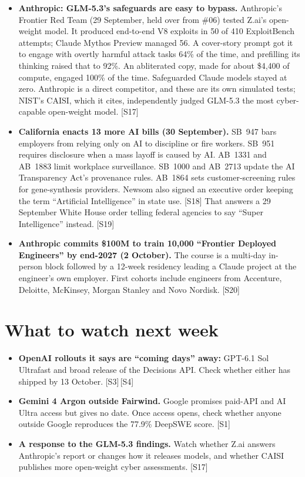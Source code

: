 \documentclass[11pt,a4paper]{article}
\newcommand{\srcref}[1]{\textcolor{brandaccent}{[S#1]}}
\begin{document}
\begin{itemize}
  \item \textbf{Anthropic: GLM-5.3's safeguards are easy to bypass.} Anthropic's Frontier
  Red Team (29 September, held over from \#06) tested Z.ai's open-weight model. It produced
  end-to-end V8 exploits in 50 of 410 ExploitBench attempts; Claude Mythos Preview managed 56.
  A cover-story prompt got it to engage with overtly harmful attack tasks 64\% of the time,
  and prefilling its thinking raised that to 92\%. An abliterated copy, made for about \$4,400
  of compute, engaged 100\% of the time. Safeguarded Claude models stayed at zero. Anthropic
  is a direct competitor, and these are its own simulated tests; NIST's CAISI, which it cites,
  independently judged GLM-5.3 the most cyber-capable open-weight model. \srcref{17}
  \item \textbf{California enacts 13 more AI bills (30 September).} SB~947 bars employers
  from relying only on AI to discipline or fire workers. SB~951 requires disclosure when a mass
  layoff is caused by AI. AB~1331 and AB~1883 limit workplace surveillance. SB~1000 and
  AB~2713 update the AI Transparency Act's provenance rules. AB~1864 sets customer-screening
  rules for gene-synthesis providers. Newsom also signed an executive order keeping the term
  ``Artificial Intelligence'' in state use. \srcref{18} That answers a 29 September White House
  order telling federal agencies to say ``Super Intelligence'' instead. \srcref{19}
  \item \textbf{Anthropic commits \$100M to train 10,000 ``Frontier Deployed Engineers'' by
  end-2027 (2 October).} The course is a multi-day in-person block followed by a 12-week residency
  leading a Claude project at the engineer's own employer. First cohorts include engineers
  from Accenture, Deloitte, McKinsey, Morgan Stanley and Novo Nordisk. \srcref{20}
\end{itemize}

\section{What to watch next week}

\begin{itemize}
  \item \textbf{OpenAI rollouts it says are ``coming days'' away:} GPT-6.1 Sol Ultrafast and
  broad release of the Decisions API. Check whether either has shipped by 13 October. \srcref{3}\,\srcref{4}
  \item \textbf{Gemini 4 Argon outside Fairwind.} Google promises paid-API and AI Ultra access but
  gives no date. Once access opens, check whether anyone outside Google reproduces the 77.9\% DeepSWE score. \srcref{1}
  \item \textbf{A response to the GLM-5.3 findings.} Watch whether Z.ai answers Anthropic's
  report or changes how it releases models, and whether CAISI publishes more open-weight cyber assessments. \srcref{17}
\end{itemize}
\end{document}
